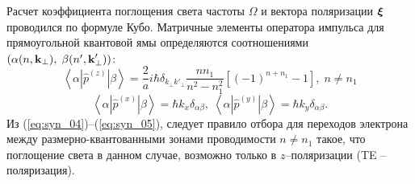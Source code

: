 Расчет коэффициента поглощения света частоты $\Omega$ и вектора поляризации $\boldsymbol{\mathbf{\xi}}$ проводился по формуле Кубо.
Матричные элементы оператора импульса  для прямоугольной квантовой ямы определяются соотношениями $(\alpha (n, \boldsymbol{\mathbf{k}}{_\bot}), \; \beta (n', \boldsymbol{\mathbf{k}}'_{\bot}))$:
\begin{equation} \label{eq:syn_04}
\left\langle \alpha \left| \hat{p}^{(z)} \right| \beta \right\rangle = \frac{2}{a} i\hbar \delta_{k_\bot k'_\bot} \frac{n n_1}{n^2 - n_1^2} \left[(-1)^{n+n_1} -1 \right] , \; n \neq n_1
\end{equation}
\begin{equation} \label{eq:syn_05}
\left\langle \alpha \left| \hat{p}^{(x)} \right| \beta \right\rangle = \hbar k_x \delta_{\alpha\beta},\;
\left\langle \alpha \left| \hat{p}^{(y)} \right| \beta \right\rangle = \hbar k_y \delta_{\alpha\beta}.
\end{equation} 
Из (\ref{eq:syn_04})--(\ref{eq:syn_05}), следует правило отбора для переходов электрона между размерно-квантованными зонами проводимости $n \neq n_1$ такое, что поглощение света в данном случае, возможно только в $z$–поляризации (TE -- поляризация).

